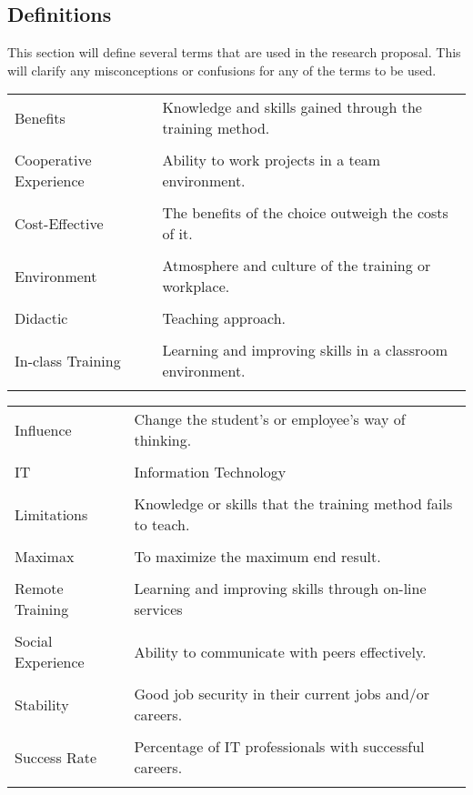 \documentclass[titlepage]{article}
\begin{document}
\subsection{Definitions}
This section will define several terms that are used in the research proposal.  This will clarify
any misconceptions or confusions for any of the terms to be used.\\

\begin{tabularx}{\textwidth}{lX}
Benefits & Knowledge and skills gained through the training method.\\\\
Cooperative Experience & Ability to work projects in a team environment.\\\\
Cost-Effective & The benefits of the choice outweigh the costs of it.\\\\
Environment & Atmosphere and culture of the training or workplace.\\\\
Didactic & Teaching approach.\\\\
In-class Training & Learning and improving skills in a classroom environment.\\\\
\end{tabularx}

\begin{tabularx}{\textwidth}{lX}
Influence & Change the student's or employee's way of thinking.\\\\
IT & Information Technology \\\\
Limitations & Knowledge or skills that the training method fails to teach.\\\\
Maximax & To maximize the maximum end result.\\\\
Remote Training & Learning and improving skills through on-line services\\\\
Social Experience & Ability to communicate with peers effectively.\\\\
Stability & Good job security in their current jobs and/or careers.\\\\
Success Rate & Percentage of IT professionals with successful careers.\\\\
\end{tabularx}
\end{document}
